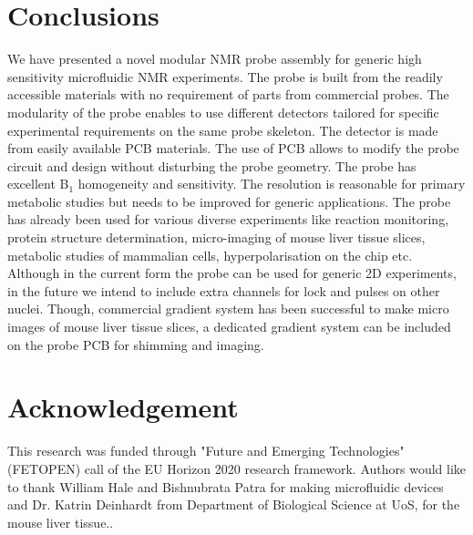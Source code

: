 \documentclass[preprint,12pt]{article}
\begin{document}
\section{Conclusions}
We have presented a novel modular NMR probe assembly for generic high sensitivity microfluidic NMR experiments. The probe is built from the readily accessible materials with no requirement of parts from commercial probes. The modularity of the probe enables to use different detectors tailored for specific experimental requirements on the same probe skeleton. The detector is made from easily available PCB materials. The use of PCB allows to modify the probe circuit and design without disturbing the probe geometry. The probe has excellent B$_1$ homogeneity and sensitivity. The resolution is reasonable for primary metabolic studies but needs to be improved for generic applications. The probe has already been used for various diverse experiments like reaction monitoring, protein structure determination, micro-imaging of mouse liver tissue slices, metabolic studies of mammalian cells, hyperpolarisation on the chip etc. Although in the current form the probe can be used for generic 2D experiments, in the future we intend to include extra channels for lock and pulses on other nuclei. Though, commercial gradient system has been successful to make micro images of mouse liver tissue slices, a dedicated gradient system can be included on the probe PCB for shimming and imaging.
\section{Acknowledgement}
This research was funded through "Future and Emerging Technologies" (FETOPEN) call of the EU Horizon 2020 research framework. Authors would like to thank William Hale and Bishnubrata Patra for making microfluidic devices and Dr. Katrin Deinhardt from Department of Biological Science at UoS, for the mouse liver tissue..
\clearpage


\end{document}
